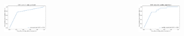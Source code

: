 \documentclass[t]{beamer}
\theoremstyle{definition}
\begin{document}
\begin{frame}
{\begin{columns}
    \begin{column}{0.5\textwidth}
    \begin{figure}
    \begin{subfigure}{\linewidth}
    \includegraphics[width=\linewidth]{figs/roc_auc_unsupervised.pdf}
    \end{subfigure}
    \end{figure}
    \end{column}

    \begin{column}{0.5\textwidth}
    \begin{figure}
    \begin{subfigure}{\linewidth}
    \includegraphics[width=\linewidth]{figs/roc_auc_weakly_supervised.pdf}
    \end{subfigure}
    \end{figure}
    \end{column}
    \end{columns}
    }
\end{frame}
\end{document}
